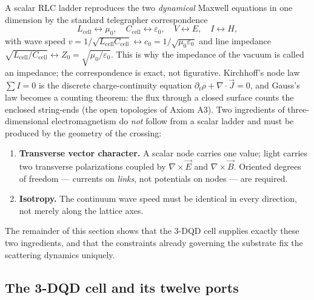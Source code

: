 \documentclass[11pt,a4paper]{article}
\theoremstyle{plain}
\theoremstyle{remark}
\begin{document}
A scalar RLC ladder reproduces the two \emph{dynamical} Maxwell equations in one dimension by the standard telegrapher correspondence
\begin{equation}\label{maxwell3d:telegraph}
L_{\text{cell}} \leftrightarrow \mu_0, \quad C_{\text{cell}} \leftrightarrow \varepsilon_0, \quad V \leftrightarrow E, \quad I \leftrightarrow H,
\end{equation}
with wave speed $v = 1/\sqrt{L_{\text{cell}}C_{\text{cell}}} \leftrightarrow c_0 = 1/\sqrt{\mu_0\varepsilon_0}$ and line impedance $\sqrt{L_{\text{cell}}/C_{\text{cell}}} \leftrightarrow Z_0 = \sqrt{\mu_0/\varepsilon_0}$. This is why the impedance of the vacuum is called an impedance; the correspondence is exact, not figurative. Kirchhoff's node law $\sum I = 0$ is the discrete charge-continuity equation $\partial_t\rho + \nabla\!\cdot\!\vec{J} = 0$, and Gauss's law becomes a counting theorem: the flux through a closed surface counts the enclosed string-ends (the open topologies of Axiom A3). Two ingredients of three-dimensional electromagnetism do \emph{not} follow from a scalar ladder and must be produced by the geometry of the crossing:
\begin{enumerate}[leftmargin=2em,itemsep=1pt]
\item \textbf{Transverse vector character.} A scalar node carries one value; light carries two transverse polarizations coupled by $\nabla\times\vec{E}$ and $\nabla\times\vec{B}$. Oriented degrees of freedom --- currents on \emph{links}, not potentials on nodes --- are required.
\item \textbf{Isotropy.} The continuum wave speed must be identical in every direction, not merely along the lattice axes.
\end{enumerate}
The remainder of this section shows that the 3-DQD cell supplies exactly these two ingredients, and that the constraints already governing the substrate fix the scattering dynamics uniquely.

\subsection{The 3-DQD cell and its twelve ports}
\label{maxwell3d:cell}
\end{document}
